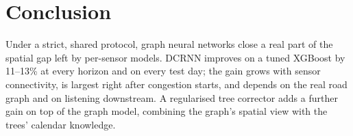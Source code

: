 \documentclass[conference]{IEEEtran}
\begin{document}
\section{Conclusion}
Under a strict, shared protocol, graph neural networks close a real part of the spatial gap left by per-sensor models.
DCRNN improves on a tuned XGBoost by 11--13\% at every horizon and on every test day; the gain grows with sensor
connectivity, is largest right after congestion starts, and depends on the real road graph and on listening downstream.
A regularised tree corrector adds a further gain on top of the graph model, combining the graph's spatial view with the
trees' calendar knowledge.



\end{document}
